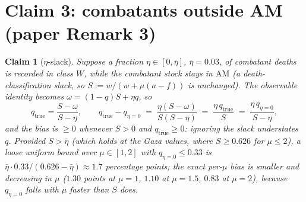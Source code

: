 \documentclass[11pt,a4paper]{article}
\theoremstyle{plain}
\newtheorem{claim}{Claim}
\theoremstyle{remark}
\begin{document}
\section{Claim 3: combatants outside AM (paper Remark 3)}

\begin{claim}[$\eta$-slack]\label{cl:remark}
Suppose a fraction $\eta\in[0,\bar\eta]$, $\bar\eta=0.03$, of combatant \emph{deaths} is recorded in class $W$, while the combatant stock stays in $\mathrm{AM}$ (a death-classification slack, so $S:=w/(w+\mu(a-f))$ is unchanged). The observable identity becomes $\omega=(1-q)S+\eta q$, so
\[
q_{\mathrm{true}} = \frac{S-\omega}{S-\eta},
\qquad
q_{\mathrm{true}}-q_{\eta=0} \;=\; \frac{\eta(S-\omega)}{S(S-\eta)}
\;=\; \frac{\eta\,q_{\mathrm{true}}}{S}
\;=\; \frac{\eta\,q_{\eta=0}}{S-\eta},
\]
and the bias is $\ge 0$ whenever $S>0$ and $q_{\mathrm{true}}\ge 0$: ignoring the slack \emph{understates} $q$. Provided $S>\bar\eta$ (which holds at the Gaza values, where $S\ge 0.626$ for $\mu\le 2$), a loose uniform bound over $\mu\in[1,2]$ with $q_{\eta=0}\le 0.33$ is $\bar\eta\cdot 0.33/(0.626-\bar\eta)\approx 1.7$ percentage points; the exact per-$\mu$ bias is smaller and decreasing in $\mu$ ($1.30$ points at $\mu=1$, $1.10$ at $\mu=1.5$, $0.83$ at $\mu=2$), because $q_{\eta=0}$ falls with $\mu$ faster than $S$ does.
\end{claim}
\end{document}
